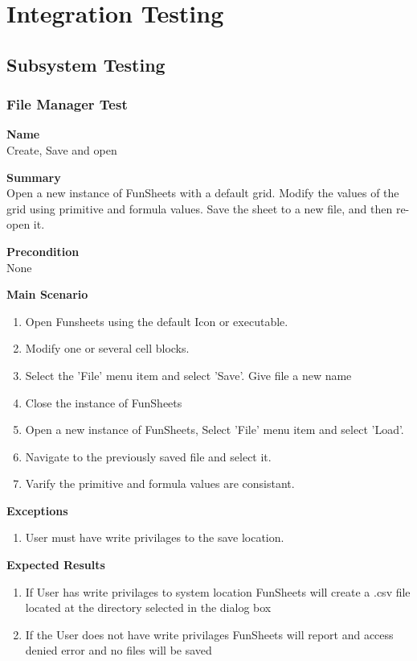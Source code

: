 \documentclass[12pt]{article}
\begin{document}
\section{Integration Testing}

\subsection{Subsystem Testing}

\subsubsection{File Manager Test} \label{uc:1}

\noindent
{\bf Name}\\
Create, Save and open

\noindent
{\bf Summary}\\
Open a new instance of FunSheets with a default grid. Modify the values of the grid using primitive and formula values.
Save the sheet to a new file, and then re-open it.

\noindent
{\bf Precondition}\\
None

\noindent
{\bf Main Scenario}\
\vspace*{-0.2in}
\begin{enumerate}
\item Open Funsheets using the default Icon or executable.
\item Modify one or several cell blocks.
\item Select the 'File' menu item and select 'Save'. Give file a new name
\item Close the instance of FunSheets
\item Open a new instance of FunSheets, Select 'File' menu item and select 'Load'.
\item Navigate to the previously saved file and select it.
\item Varify the primitive and formula values are consistant.
\end{enumerate}

{\bf Exceptions}\
\begin{enumerate}
\item User must have write privilages to the save location.
\end{enumerate}
{\bf Expected Results}\
\begin{enumerate}
\item If User has write privilages to system location FunSheets will create a .csv file located at the directory selected in the dialog box
\item If the User does not have write privilages FunSheets will report and access denied error and no files will be saved
\end{enumerate}
\end{document}
